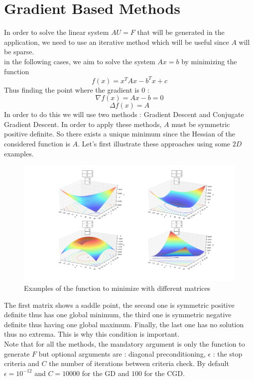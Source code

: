 \documentclass[a4paper]{report}
\begin{document}
\section{Gradient Based Methods}
In order to solve the linear system $AU=F$ that will be generated in the application, we need to use an iterative method which will be useful since $A$ will be sparse. \\in the following cases,
we aim to solve the system $Ax=b$ by minimizing the function
\[
f(x)=x^TAx-b^Tx+c
\]
Thus finding the point where the gradient is $0$ :
\[
\nabla f(x)=Ax-b=0
\]
\[
\Delta f(x)=A
\]
In order to do this we will use two methods : Gradient Descent and Conjugate Gradient Descent. In order to apply these methods, $A$ must be symmetric positive definite. So there exists a unique minimum since the Hessian of the considered function is $A$.
Let's first illustrate these approaches using some $2D$ examples.
\begin{figure}[H]
\begin{center}
\includegraphics[scale=0.20]{courbes.png}\caption{Examples of the function to minimize with different matrices}
\end{center}
\end{figure}
The first matrix shows a saddle point, the second one is symmetric positive definite thus has one global minimum, the third one is symmetric negative definite thus having one global maximum. Finally, the last one has no solution thus no extrema. This is why this condition is important.
\\
Note that for all the methods, the mandatory argument is only the function to generate $F$ but optional arguments are : diagonal preconditioning, $\epsilon$ : the stop criteria and $C$ the number of iterations between criteria check. By default $\epsilon=10^{-12}$ and $C=10000$ for the GD and $100$ for the CGD.
\end{document}
